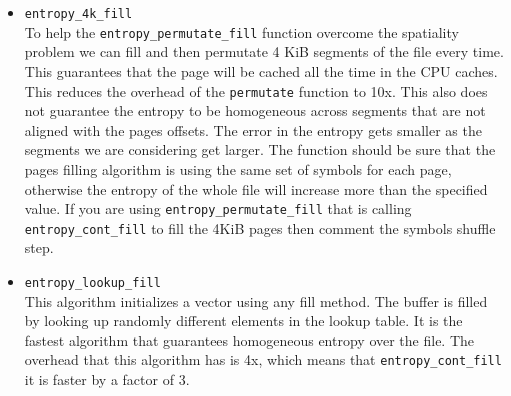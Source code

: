 \begin{itemize}
\item \verb+entropy_4k_fill+ \\
    To help the \verb+entropy_permutate_fill+ function overcome the spatiality problem we can fill and then permutate
    4 KiB segments of the file every time. This guarantees that the page will be cached all the time
    in the CPU caches. This reduces the overhead of the \verb+permutate+ function to 10x. This also does not guarantee
    the entropy to be homogeneous across segments that are not aligned with the pages offsets. The error in the entropy
    gets smaller as the segments we are considering get larger. The function should be sure that the pages filling
    algorithm is using the same set of symbols for each page, otherwise the entropy of the whole file will increase more than the specified value. If
    you are using \verb+entropy_permutate_fill+ that is calling \verb+entropy_cont_fill+  to fill the 4KiB pages then comment the 
    symbols shuffle step.

\item \verb+entropy_lookup_fill+\\
    This algorithm initializes a vector using any fill method.
    The buffer is filled by looking up randomly different elements
    in the lookup table. It is the fastest algorithm that guarantees
    homogeneous entropy over the file. The overhead that this algorithm has is 4x, which means
    that \verb+entropy_cont_fill+ it is faster by a factor of 3.
\end{itemize}
